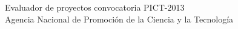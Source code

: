 \item Evaluador de proyectos convocatoria PICT-2013\\
Agencia Nacional de Promoci\'on de la Ciencia y la Tecnolog\'ia

